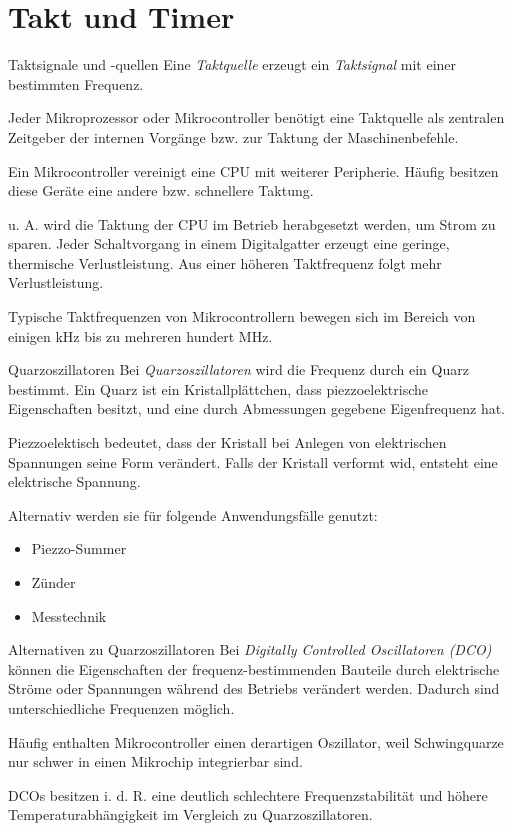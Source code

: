 \section{Takt und Timer}

\begin{defi}{Taktsignale und -quellen}
    Eine \emph{Taktquelle} erzeugt ein \emph{Taktsignal} mit einer bestimmten Frequenz.

    Jeder Mikroprozessor oder Mikrocontroller benötigt eine Taktquelle als zentralen Zeitgeber der internen Vorgänge bzw. zur Taktung der Maschinenbefehle.

    Ein Mikrocontroller vereinigt eine CPU mit weiterer Peripherie.
    Häufig besitzen diese Geräte eine andere bzw. schnellere Taktung.

    u. A. wird die Taktung der CPU im Betrieb herabgesetzt werden, um Strom zu sparen.
    Jeder Schaltvorgang in einem Digitalgatter erzeugt eine geringe, thermische Verlustleistung.
    Aus einer höheren Taktfrequenz folgt mehr Verlustleistung.

    Typische Taktfrequenzen von Mikrocontrollern bewegen sich im Bereich von einigen kHz bis zu mehreren hundert MHz.
\end{defi}

\begin{defi}{Quarzoszillatoren}
    Bei \emph{Quarzoszillatoren} wird die Frequenz durch ein Quarz bestimmt.
    Ein Quarz ist ein Kristallplättchen, dass piezzoelektrische Eigenschaften besitzt, und eine durch Abmessungen gegebene Eigenfrequenz hat.

    Piezzoelektisch bedeutet, dass der Kristall bei Anlegen von elektrischen Spannungen seine Form verändert.
    Falls der Kristall verformt wid, entsteht eine elektrische Spannung.

    Alternativ werden sie für folgende Anwendungsfälle genutzt:
    \begin{itemize}
        \item Piezzo-Summer
        \item Zünder
        \item Messtechnik
    \end{itemize}
\end{defi}

\begin{bonus}{Alternativen zu Quarzoszillatoren}
    Bei \emph{Digitally Controlled Oscillatoren (DCO)} können die Eigenschaften der frequenz-bestimmenden Bauteile durch elektrische Ströme oder Spannungen während des Betriebs verändert werden.
    Dadurch sind unterschiedliche Frequenzen möglich.

    Häufig enthalten Mikrocontroller einen derartigen Oszillator, weil Schwingquarze nur schwer in einen Mikrochip integrierbar sind.

    DCOs besitzen i. d. R. eine deutlich schlechtere Frequenzstabilität und höhere Temperaturabhängigkeit im Vergleich zu Quarzoszillatoren.
\end{bonus}

